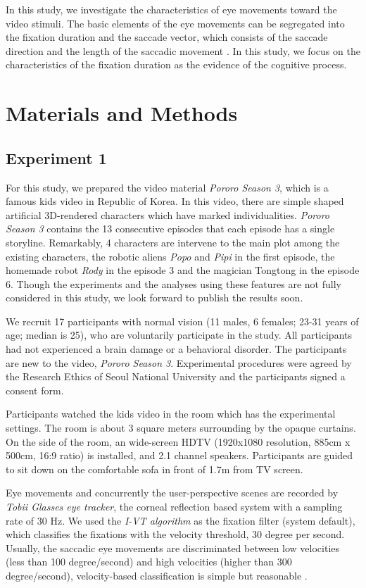 \documentclass[10pt,letterpaper]{article}
\begin{document}
In this study, we investigate the characteristics of eye movements toward the video stimuli. The basic elements of the eye movements can be segregated into the fixation duration and the saccade vector, which consists of the saccade direction and the length of the saccadic movement \cite{Findlay1999,Feng2006}. In this study, we focus on the characteristics of the fixation duration as the evidence of the cognitive process.

\section{Materials and Methods}

\subsection{Experiment 1}

For this study, we prepared the video material \textit{Pororo Season 3}, which is a famous kids video in Republic of Korea. In this video, there are simple shaped artificial 3D-rendered characters which have marked individualities. \textit{Pororo Season 3} contains the 13 consecutive episodes that each episode has a single storyline. Remarkably, 4 characters are intervene to the main plot among the existing characters, the robotic aliens \textit{Popo} and \textit{Pipi} in the first episode, the homemade robot \textit{Rody} in the episode 3 and the magician Tongtong in the episode 6. Though the experiments and the analyses using these features are not fully considered in this study, we look forward to publish the results soon. 

We recruit 17 participants with normal vision (11 males, 6 females; 23-31 years of age; median is 25), who are voluntarily participate in the study. All participants had not experienced a brain damage or a behavioral disorder. The participants are new to the video, \textit{Pororo Season 3}. Experimental procedures were agreed by the Research Ethics of Seoul National University and the participants signed a consent form.

Participants watched the kids video in the room which has the experimental settings. The room is about 3 square meters surrounding by the opaque curtains. On the side of the room, an wide-screen HDTV (1920x1080 resolution, 885cm x 500cm, 16:9 ratio) is installed, and 2.1 channel speakers. Participants are guided to sit down on the comfortable sofa in front of 1.7m from TV screen.

Eye movements and concurrently the user-perspective scenes are recorded by \textit{Tobii Glasses eye tracker}, the corneal reflection based system with a sampling rate of 30 Hz. We used the \textit{I-VT algorithm} as the fixation filter (system default), which classifies the fixations with the velocity threshold, 30 degree per second. Usually, the saccadic eye movements are discriminated between low velocities (less than 100 degree/second) and high velocities (higher than 300 degree/second), velocity-based classification is simple but reasonable \cite{Salvucci2000}.
\end{document}
